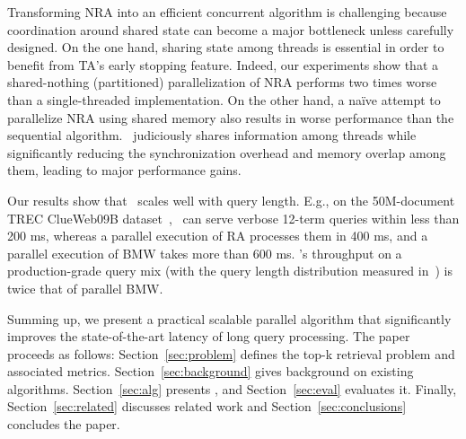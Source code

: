 Transforming NRA into an efficient concurrent algorithm is challenging because coordination around 
shared state can become a major bottleneck unless carefully designed. On the one hand,
sharing state among threads is essential in order to benefit from TA's early stopping feature.
Indeed, our experiments show  that a shared-nothing (partitioned) parallelization of NRA performs two times 
worse than a single-threaded implementation. On the other hand, 
a na\"ive attempt to parallelize NRA using shared memory also results in 
worse performance than the sequential algorithm. \alg\ judiciously shares 
information among threads while significantly reducing the synchronization 
overhead and memory overlap among them, 
leading to major performance gains. 

Our results show that \alg\ scales well with 
query length.
E.g., on the 50M-document TREC ClueWeb09B dataset~\cite{ClueWeb09}, %
\alg\ can serve verbose 12-term queries within less than 200 ms, 
whereas a parallel execution of RA processes them in 400 ms, and a parallel execution of BMW takes more than 600 ms. 
\alg's throughput on a production-grade query mix (with the query length distribution measured in~\cite{sigir/Guy16}) is twice that of parallel BMW.

Summing up, we present a practical scalable parallel algorithm that significantly improves the state-of-the-art latency  of long query processing.
%
The paper proceeds as follows: Section~\ref{sec:problem} defines the top-k retrieval problem and associated metrics. 
Section~\ref{sec:background} gives background on existing algorithms. 
Section~\ref{sec:alg} presents \alg, and Section~\ref{sec:eval}  evaluates it.
Finally, 
Section~\ref{sec:related} discusses related work and Section~\ref{sec:conclusions} concludes the paper.
